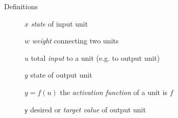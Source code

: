 \documentclass{beamer}
\newcommand{\ytarg} {{\tt Y}}
\renewcommand{\ytarg} {\mathsf{y}}
\begin{document}
\begin{frame}
Definitions
\begin{description}
\item[ ] $x$ {\em state} of input unit
\item[] $w$ {\em weight} connecting two units
\item[] $u$ total {\em input} to a unit (e.g. to output unit)
\item[] $y$ state of output unit
\item[] $y=f(u)$ the {\em activation function} of a unit is $f$
\item[] $\ytarg$ desired or {\em target value} of output unit
\end{description}

\end{frame}

\end{document}
